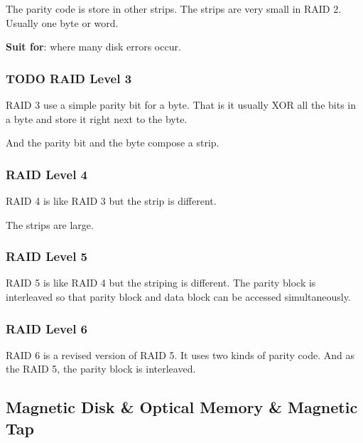\documentclass[11pt]{article}
\begin{document}
The parity code is store in other strips. The strips are very small in RAID 2. Usually one byte or word.

\textbf{Suit for}: where many disk errors occur.

\subsubsection{{\bfseries\sffamily TODO} RAID Level 3}
\label{sec:orgac5653f}

RAID 3 use a simple parity bit for a byte. That is it usually XOR all the bits in a byte and store it right next to the byte. 

And the parity bit and the byte compose a strip.

\subsubsection{RAID Level 4}
\label{sec:org7b14b0f}

RAID 4 is like RAID 3 but the strip is different.

The strips are large.

\subsubsection{RAID Level 5}
\label{sec:org9e12960}

RAID 5 is like RAID 4 but the striping is different. The parity block is interleaved so that parity block and data block can be accessed simultaneously.

\subsubsection{RAID Level 6}
\label{sec:org30dea5d}

RAID 6 is a revised version of RAID 5. It uses two kinds of parity code. And as the RAID 5, the parity block is interleaved.

\subsection{Magnetic Disk \& Optical Memory \& Magnetic Tap}
\label{sec:org782471e}
\end{document}
